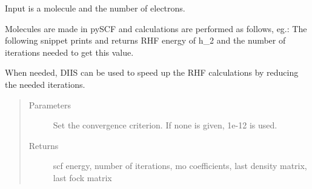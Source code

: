 \documentclass[letterpaper,10pt,english]{sphinxmanual}
\begin{document}
\begin{fulllineitems}
\label{\detokenize{RHF:ghf.RHF.RHF}}
Input is a molecule and the number of electrons.

Molecules are made in pySCF and calculations are performed as follows, eg.:
The following snippet prints and returns RHF energy of h\_2
and the number of iterations needed to get this value.

\begin{sphinxVerbatim}[commandchars=\\\{\}]
          
   
\end{sphinxVerbatim}

\begin{fulllineitems}
\label{\detokenize{RHF:ghf.RHF.RHF.diis}}
When needed, DIIS can be used to speed up the RHF calculations by reducing the needed iterations.
\begin{quote}\begin{description}
\item[{Parameters}] \leavevmode
{} \textendash{} Set the convergence criterion. If none is given, 1e-12 is used.

\item[{Returns}] \leavevmode
scf energy, number of iterations, mo coefficients, last density matrix, last fock matrix

\end{description}\end{quote}


\end{fulllineitems}
\end{fulllineitems}
\end{document}
